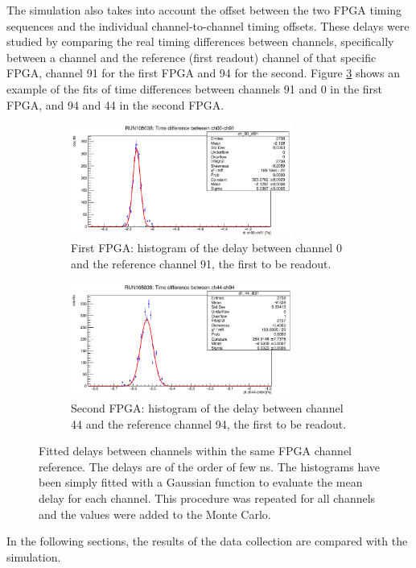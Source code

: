 The simulation also takes into account the offset between the two FPGA timing sequences and the 
individual channel-to-channel timing offsets. These delays were studied by comparing the real timing 
differences between channels, specifically between a channel and the reference (first readout) channel of that 
specific FPGA, channel 91 for the first FPGA and 94 for the second. Figure \ref{fig:delaychannels} 
shows an example of the fits of time differences between channels 91 and 0 in the first FPGA, and 94 and 44 in the second FPGA. 

\begin{figure}[!h]
  \centering
  \begin{subfigure}[b]{\textwidth}
      \centering
      \includegraphics[width=0.8\textwidth]{figures/png/Screenshot from 2023-12-03 11-50-50.png}
      \caption{First FPGA: histogram of the delay between channel 0 and the reference channel 91, the first to be readout.}
      \label{fig:delay1}
  \end{subfigure}
  \hfill
  \begin{subfigure}[b]{\textwidth}
      \centering
      \includegraphics[width=0.8\textwidth]{figures/png/Screenshot from 2023-12-03 11-50-33.png}
      \caption{Second FPGA: histogram of the delay between channel 44 and the reference channel 94, the first to be readout.}
      \label{fig:delay2}
  \end{subfigure}
     \caption{Fitted delays between channels within the same FPGA channel reference. The delays are of the order of few ns. 
     The histograms have been simply fitted with a Gaussian function to evaluate the mean delay for each channel. This procedure was repeated for all channels and 
     the values were added to the Monte Carlo.}
     \label{fig:delaychannels}
\end{figure}
In the following sections, the results of the data collection are compared with the simulation.

